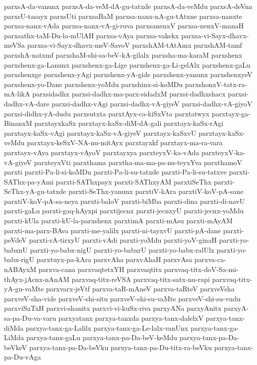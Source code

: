 {parxsA-da-vanunx
parxsA-da-veM-dA-gu-tatxde
parxsA-da-veMdu
parxsA-deVna
parxsU-tasayx
parxsUti
parxsaBaM
parxsa-nanx-nA-gu-tAtxne
parxsa-nanxte
parxsa-nanx-vAda
parxsa-nanx-vA-gi-ruva
parxsanenxV
parxsa-nenxV-manaH
parxsathx-taM-Du-la-mUlAH
parxsa-vAya
parxsa-vakekx
parxsa-vi-Sayx-dhavx-meVSa
parxsa-vi-Sayx-dhavx-meV-SavoV
parxshAM-tAtAmx
parxshAM-tamf
parxshA-natxmf
parxshaM-shi-sa-beV-kA-gilalx
parxsha-ma-karaM
parxshenx
parxshenx-ga-Lanunx
parxshenx-ga-Lige
parxshenx-ga-Li-gelAlx
parxshenx-gaLu
parxshenxge
parxshenx-yAgi
parxshenx-yA-gide
parxshenx-yanunx
parxshenxyeV
parxshenx-yo-Dane
parxshenx-yoMdu
parxshinx-si-koMDu
parxshonxV-tatx-ra-mA-likA
parxsidadhx
parxsi-dadhx-ma-parx-sidadxM
parxsi-dadhxshacx
parxsi-dadhx-vA-dare
parxsi-dadhx-vAgi
parxsi-dadhx-vA-giyeV
parxsi-dadhx-vA-giyoV
parxsi-didhx-yA-dudu
parxsutxta
parxtAyx-ca-kiSxVta
parxtatwyx
parxtayx-ga-BinanxM
parxtayxkaSx
parxtayx-kaSx-diM-dA-gali
parxtayx-kaSx-rAgi
parxtayx-kaSx-vAgi
parxtayx-kaSx-vA-giyeV
parxtayx-kaSxvU
parxtayx-kaSx-veMdu
parxtayx-keSxV-NA-nu-mitAyx
parxtayxkf
parxtayx-ma-ra-vara
parxtayx-vAya
parxtayx-vAyoV
parxtayxya
parxteyxV-ka-vAda
parxteyxV-ka-vA-giyeV
parxteyxVti
parxthama
parxtha-ma-ma-pa-nu-teyxYva
parxthamoV
parxti
parxti-Pa-li-si-koMDu
parxti-Pa-li-su-tatxde
parxti-Pa-li-su-tatxve
parxti-SAThx-pa-yAmi
parxti-SAThxpayx
parxti-SAThxyAM
parxtiSeThx
parxti-SeThx-yA-gu-tatxde
parxti-SeThx-yanunx
parxtiV-kAra
parxtiV-koV-pA-sane
parxtiV-koV-pA-sa-neya
parxti-baloV
parxti-biMba
parxti-dina
parxti-di-navU
parxti-gaLu
parxti-gaq-hAyxpi
parxtijecnx
parxti-jecnxyU
parxti-jecnx-yoMdu
parxti-kUla
parxti-kU-la-parxshenx
parxtimA
parxti-mAsu
parxti-mAyAM
parxti-ma-parx-BAva
parxti-me-yalilx
parxti-ni-tayxvU
parxti-pA-dane
parxti-peVdeV
parxti-rA-tirxyU
parxti-vAdi
parxti-yoMdu
parxti-yoV-ginaH
parxti-yo-babxnU
parxti-yo-babx-nigU
parxti-yo-babxrU
parxti-yo-babx-ralUlx
parxti-yo-babx-rigU
parxtuyx-pa-kAra
parxvAha
parxvAhaH
parxvAsa
parxva-ca-nABAyxM
parxva-cana
parxvaqtetxYH
parxvaqtitx
parxvaq-titx-doV-Sa-mi-thAyx-jAcnx-nAnAM
parxvaq-titx-reVSA
parxvaq-titx-satx-nu-rapi
parxvaq-titx-yA-gu-vaMte
parxvarx-jeVtf
parxva-taR-mAneV
parxva-taRteV
parxveVsha
parxveV-sha-vide
parxveV-shi-situ
parxveV-shi-su-vaMte
parxveV-shi-su-vudu
parxviSaTxH
parxvi-shanitx
parxvi-vi-kuSx-riva
parxyANa
parxyAnitx
parxyA-sa-pa-Du-va-varu
parxyatanx
parxya-tanxda
parxya-tanx-dalelxV
parxya-tanx-diMda
parxya-tanx-ga-Lalilx
parxya-tanx-ga-Le-lalx-vanUnx
parxya-tanx-ga-LiMda
parxya-tanx-gaLu
parxya-tanx-pa-Da-beV-keMdu
parxya-tanx-pa-Da-beVkeV
parxya-tanx-pa-Da-beVku
parxya-tanx-pa-Du-titx-ra-beVku
parxya-tanx-pa-Du-vAga
}
